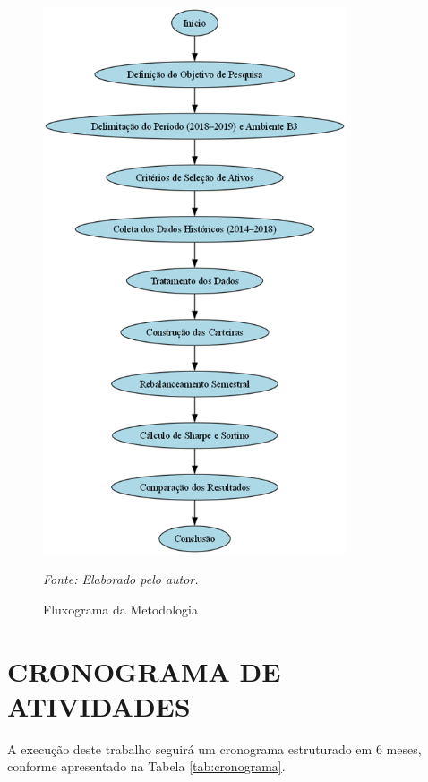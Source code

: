 \begin{figure}[H]
\centering
\includegraphics[width=0.8\textwidth]{fluxograma_metodologia.png}
\caption{Fluxograma da Metodologia}
\textit{Fonte: Elaborado pelo autor.}
\label{fig:fluxograma_metodologia}
\end{figure}

\section{CRONOGRAMA DE ATIVIDADES}

A execução deste trabalho seguirá um cronograma estruturado em 6 meses, conforme apresentado na Tabela \ref{tab:cronograma}.

